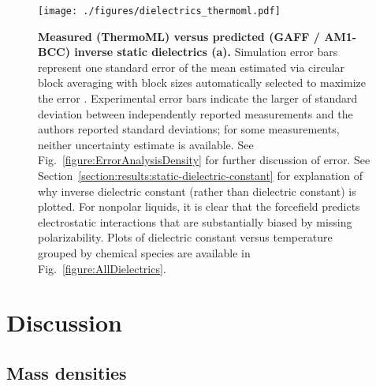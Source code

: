 \documentclass[aps,pre,twocolumn,nofootinbib,superscriptaddress,linenumbers]{revtex4-1}
\begin{document}

\begin{figure}
\texttt{[image: ./figures/dielectrics\_thermoml.pdf]}

\caption{{\bf Measured (ThermoML) versus predicted (GAFF / AM1-BCC) inverse static dielectrics (a).}
Simulation error bars represent one standard error of the mean estimated via circular block averaging \cite{sheppard_2015_15681} with block sizes automatically selected to maximize the error \cite{flyvbjerg1989error}.  
Experimental error bars indicate the larger of standard deviation between independently reported measurements and the authors reported standard deviations; for some measurements, neither uncertainty estimate is available.  
See Fig.~\ref{figure:ErrorAnalysisDensity} for further discussion of error.  
See Section~\ref{section:results:static-dielectric-constant} for explanation of why inverse dielectric constant (rather than dielectric constant) is plotted. 
For nonpolar liquids, it is clear that the forcefield predicts electrostatic interactions that are substantially biased by missing polarizability.
Plots of dielectric constant versus temperature grouped by chemical species are available in Fig.~\ref{figure:AllDielectrics}.
}
\label{figure:Dielectric}
\end{figure}


\section{Discussion}

\subsection{Mass densities}
\end{document}
